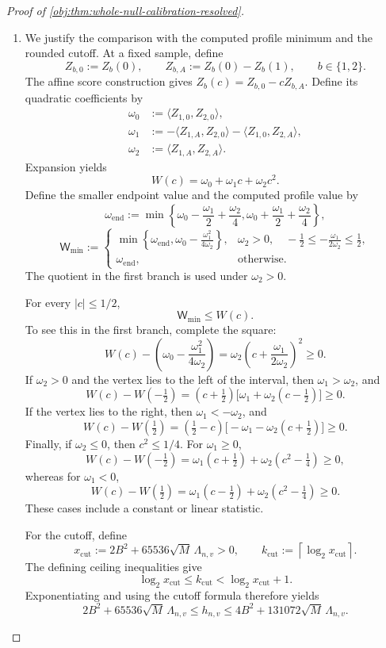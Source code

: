 \begin{proof}[Proof of \cref{obj:thm:whole-null-calibration-resolved}]
\begin{enumerate}
\item We justify the comparison with the computed profile minimum and the rounded cutoff. At a fixed sample, define
\[
Z_{b,0}:=Z_b(0),
\qquad
Z_{b,A}:=Z_b(0)-Z_b(1),
\qquad b\in\{1,2\}.
\]
The affine score construction gives \(Z_b(c)=Z_{b,0}-cZ_{b,A}\). Define its quadratic coefficients by
\[
\begin{aligned}
\omega_0&:=\langle Z_{1,0},Z_{2,0}\rangle,\\
\omega_1&:=-\langle Z_{1,A},Z_{2,0}\rangle
           -\langle Z_{1,0},Z_{2,A}\rangle,\\
\omega_2&:=\langle Z_{1,A},Z_{2,A}\rangle.
\end{aligned}
\]
Expansion yields
\[
W(c)=\omega_0+\omega_1c+\omega_2c^2.
\]
Define the smaller endpoint value and the computed profile value by
\[
\omega_{\mathrm{end}}
:=
\min\left\{
\omega_0-\frac{\omega_1}{2}+\frac{\omega_2}{4},
\omega_0+\frac{\omega_1}{2}+\frac{\omega_2}{4}
\right\},
\]
\[
\mathsf W_{\min}
:=
\begin{cases}
\displaystyle
\min\left\{\omega_{\mathrm{end}},
\omega_0-\frac{\omega_1^2}{4\omega_2}\right\},
&
\displaystyle
\omega_2>0,\quad
-\frac12\le-\frac{\omega_1}{2\omega_2}\le\frac12,\\[2mm]
\omega_{\mathrm{end}},&\text{otherwise}.
\end{cases}
\]
The quotient in the first branch is used under \(\omega_2>0\).

For every \(|c|\le1/2\),
\[
\mathsf W_{\min}\le W(c).
\]
To see this in the first branch, complete the square:
\[
W(c)-\left(\omega_0-\frac{\omega_1^2}{4\omega_2}\right)
=
\omega_2\left(c+\frac{\omega_1}{2\omega_2}\right)^2
\ge0.
\]
If \(\omega_2>0\) and the vertex lies to the left of the interval, then \(\omega_1>\omega_2\), and
\[
W(c)-W(-\tfrac12)
=
(c+\tfrac12)\bigl[\omega_1+\omega_2(c-\tfrac12)\bigr]
\ge0.
\]
If the vertex lies to the right, then \(\omega_1<-\omega_2\), and
\[
W(c)-W(\tfrac12)
=
(\tfrac12-c)\bigl[-\omega_1-\omega_2(c+\tfrac12)\bigr]
\ge0.
\]
Finally, if \(\omega_2\le0\), then \(c^2\le1/4\). For \(\omega_1\ge0\),
\[
W(c)-W(-\tfrac12)
=
\omega_1(c+\tfrac12)+\omega_2(c^2-\tfrac14)
\ge0,
\]
whereas for \(\omega_1<0\),
\[
W(c)-W(\tfrac12)
=
\omega_1(c-\tfrac12)+\omega_2(c^2-\tfrac14)
\ge0.
\]
These cases include a constant or linear statistic.

For the cutoff, define
\[
x_{\mathrm{cut}}
:=2B^2+65536\sqrt M\,\Lambda_{n,v}>0,
\qquad
k_{\mathrm{cut}}
:=\left\lceil\log_2 x_{\mathrm{cut}}\right\rceil.
\]
The defining ceiling inequalities give
\[
\log_2 x_{\mathrm{cut}}
\le k_{\mathrm{cut}}
<\log_2 x_{\mathrm{cut}}+1.
\]
Exponentiating and using the cutoff formula therefore yields
\[
2B^2+65536\sqrt M\,\Lambda_{n,v}
\le h_{n,v}
\le4B^2+131072\sqrt M\,\Lambda_{n,v}.
\]


\end{enumerate}
\end{proof}
